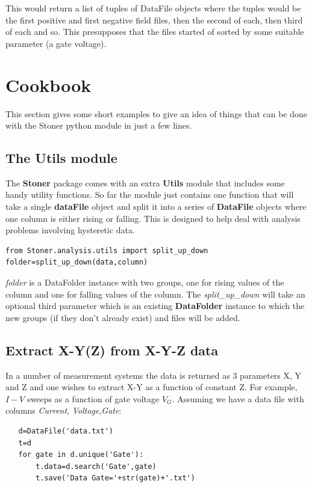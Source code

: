 \documentclass[a4paper,11pt]{scrartcl}
\begin{document}
This would return a list of tuples of DataFile objects where the tuples would be the first positive and first negative field files, then the second of each, then third of each and so. This presupposes that the files started of sorted by some suitable parameter (\eg a gate voltage).



\section{Cookbook}

This section gives some short examples to give an idea of things that can be
done with the Stoner python module in just a few lines.

\subsection{The Utils module}

The \textbf{Stoner} package comes with an extra \textbf{Utils} module that includes some handy utility functions.
So far the module just contains one function that will take a single \textbf{dataFile} object and split it
into a series of \textbf{DataFile} objects where one column is either rising or falling. This is designed to help
deal with analysis problems involving hysteretic data.
\begin{lstlisting}
from Stoner.analysis.utils import split_up_down
folder=split_up_down(data,column)
\end{lstlisting}
\textit{folder} is a DataFolder instance with two groups, one for rising values of the column and one for falling values of the column. The \textit{split\_up\_down} will take an optional third parameter which is an existing \textbf{DataFolder} instance to which the new groups (if they don't already exist) and files will be added.

\subsection{Extract X-Y(Z) from X-Y-Z data}

In a number of measurement systems the data is returned as 3 parameters X, Y and
Z and one wishes to extract X-Y as a function of constant Z. For example, $I-V$
sweeps as a function of gate voltage $V_G$. Assuming we have a data file with
columns \textit{Current}, \textit{Voltage},\textit{Gate}:

\begin{lstlisting}
   d=DataFile('data.txt')
   t=d
   for gate in d.unique('Gate'):
       t.data=d.search('Gate',gate)
       t.save('Data Gate='+str(gate)+'.txt')
\end{lstlisting}
\end{document}
